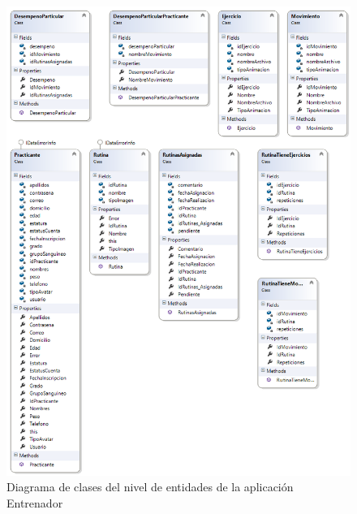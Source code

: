 \begin{figure}[H]
	\begin{center}
		\includegraphics[scale=0.7]{./Figuras/Arquitectura/Entidades_Entrenador}
	\end{center}
	\caption{Diagrama de clases del nivel de entidades de la aplicación Entrenador}
	\label{fig:DCE_Entidades}
\end{figure}

